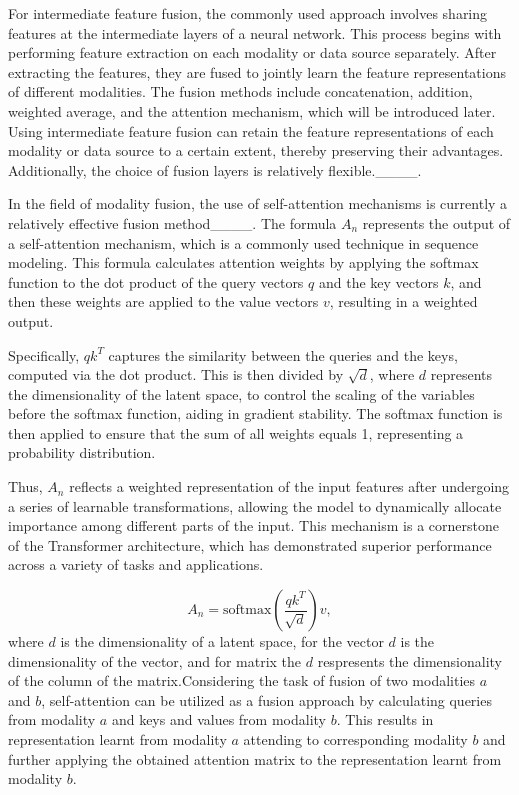 For intermediate feature fusion, the commonly used approach involves sharing features at the intermediate layers of a neural network. This process begins with performing feature extraction on each modality or data source separately. After extracting the features, they are fused to jointly learn the feature representations of different modalities. The fusion methods include concatenation, addition, weighted average, and the attention mechanism, which will be introduced later. Using intermediate feature fusion can retain the feature representations of each modality or data source to a certain extent, thereby preserving their advantages. Additionally, the choice of fusion layers is relatively flexible.____.

In the field of modality fusion, the use of self-attention mechanisms is currently a relatively effective fusion method____. The formula \( A_n \) represents the output of a self-attention mechanism, which is a commonly used technique in sequence modeling. This formula calculates attention weights by applying the softmax function to the dot product of the query vectors \( q \) and the key vectors \( k \), and then these weights are applied to the value vectors \( v \), resulting in a weighted output.

Specifically, \( qk^T \) captures the similarity between the queries and the keys, computed via the dot product. This is then divided by \( \sqrt{d} \), where \( d \) represents the dimensionality of the latent space, to control the scaling of the variables before the softmax function, aiding in gradient stability. The softmax function is then applied to ensure that the sum of all weights equals 1, representing a probability distribution.

Thus, \( A_n \) reflects a weighted representation of the input features after undergoing a series of learnable transformations, allowing the model to dynamically allocate importance among different parts of the input. This mechanism is a cornerstone of the Transformer architecture, which has demonstrated superior performance across a variety of tasks and applications.

\begin{equation}
A_n = \text{softmax}\left(\frac{qk^T}{\sqrt{d}}\right)v,
\end{equation}
where \( d \) is the dimensionality of a latent space, for the vector \( d \) is the dimensionality of the vector, and for matrix the \( d \) respresents the dimensionality of the column of the matrix.Considering the task of fusion of two modalities \( a \) and \( b \), self-attention can be utilized as a fusion approach by calculating queries from modality \( a \) and keys and values from modality \( b \). This results in representation learnt from modality \( a \) attending to corresponding modality \( b \) and further applying the obtained attention matrix to the representation learnt from modality \( b \).

